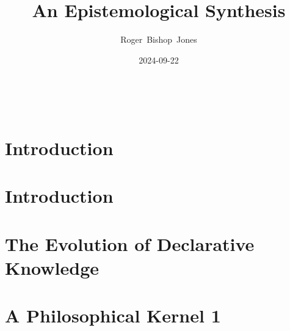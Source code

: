 \documentclass[10pt,titlepage]{book}
\title{\bf\LARGE An Epistemological Synthesis}
\author{Roger~Bishop~Jones}
\date{\small 2024-09-22}
\newcommand{\ignore}[1]{}
\begin{document}

%
                               
\begin{titlepage}
\maketitle





\end{titlepage}

\ \

\ignore{
\begin{centering}
{}
\end{centering}
}%

\setcounter{tocdepth}{2}
{\parskip-0pt\tableofcontents}


\chapter{Introduction}



\chapter{Introduction}



\theendnotes
\setcounter{endnote}{0}

\chapter{The Evolution of Declarative Knowledge}\label{EDK}



\theendnotes\setcounter{endnote}{0}

\chapter{A Philosophical Kernel 1}
\end{document}
